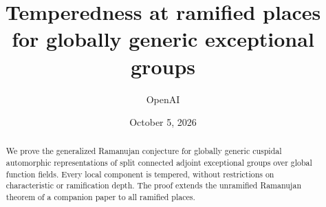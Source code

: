 \documentclass[11pt]{article}
\title{Temperedness at ramified places\\for globally generic exceptional groups}
\author{OpenAI}
\date{October 5, 2026}
\numberwithin{equation}{section}
\theoremstyle{definition}
\theoremstyle{remark}
\begin{document}
\maketitle
\begin{abstract}
We prove the generalized Ramanujan conjecture for globally generic
cuspidal automorphic representations of split connected adjoint exceptional
groups over global function fields. Every local component is tempered,
without restrictions on characteristic or ramification depth. The proof
extends the unramified Ramanujan theorem of a companion paper to all
ramified places.
\end{abstract}







\end{document}
